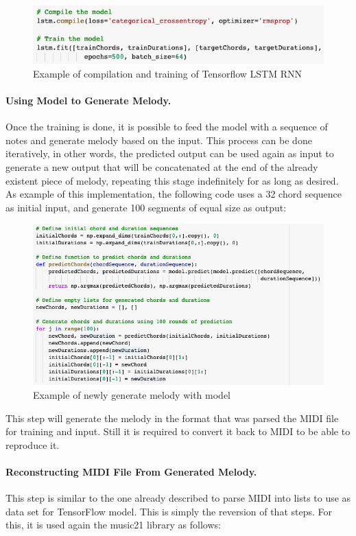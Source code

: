 \begin{figure}[h!]
  \includegraphics[width=\linewidth]{image/fig_JDF23.png}
  \caption{Example of compilation and training of Tensorflow LSTM RNN }
\end{figure}

\paragraph{Using Model to Generate Melody.}
Once the training is done, it is possible to feed the model with a sequence of notes and
generate melody based on the input. This process can be done iteratively, in other words,
the predicted output can be used again as input to generate a new output that will be
concatenated at the end of the already existent piece of melody, repeating this stage
indefinitely for as long as desired. As example of this implementation, the following code
uses a 32 chord sequence as initial input, and generate 100 segments of equal size as
output:

\begin{figure}[h!]
  \includegraphics[width=\linewidth]{image/fig_JDF24.png}
  \caption{Example of newly generate melody with model }
\end{figure}

This step will generate the melody in the format that was parsed the MIDI file for
training and input. Still it is required to convert it back to MIDI to be able to
reproduce it.

\paragraph{Reconstructing MIDI File From Generated Melody.} This step is similar to the one
already described to parse MIDI into lists to use as data set for TensorFlow model. This
is simply the reversion of that steps. For this, it is used again the music21 library as
follows:

